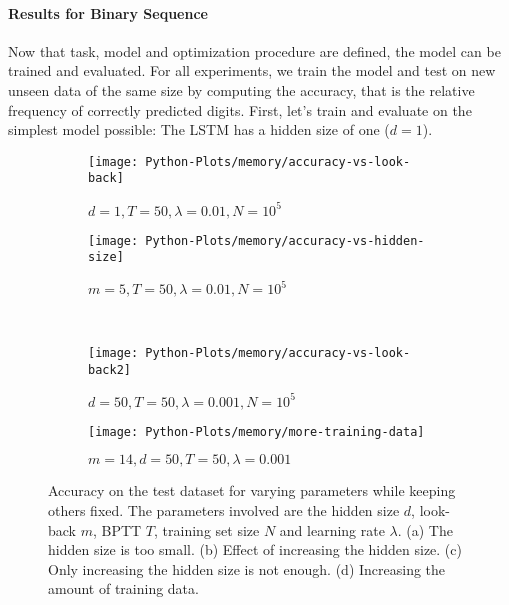 		\paragraph{Results for Binary Sequence}
		Now that task, model and optimization procedure are defined, the model can be trained and evaluated.
		For all experiments, we train the model and test on new unseen data of the same size by computing the accuracy, that is the relative frequency of correctly predicted digits.
		First, let's train and evaluate on the simplest model possible: The LSTM has a hidden size of one ($d = 1$).
		\begin{figure}[tb]
			\centering
			\begin{subfigure}[b]{0.5\linewidth}
				\centering
				\texttt{[image: Python-Plots/memory/accuracy-vs-look-back]}
				\caption{
					$d = 1, T = 50, \lambda = 0.01, N = 10^5$
					\label{fig:accuracy-vs-look-back}
				}
			\end{subfigure}%
			\begin{subfigure}[b]{0.5\linewidth}
				\texttt{[image: Python-Plots/memory/accuracy-vs-hidden-size]}
				\caption{
					$m = 5, T = 50, \lambda = 0.01, N = 10^5$
					\label{fig:accuracy-vs-hidden-size}
				}
			\end{subfigure}
			\\
			\begin{subfigure}[b]{0.5\linewidth}
				\texttt{[image: Python-Plots/memory/accuracy-vs-look-back2]}
				\caption{
					$d = 50, T = 50, \lambda = 0.001, N = 10^5$
					\label{fig:accuracy-vs-look-back2}
				}
			\end{subfigure}%
			\begin{subfigure}[b]{0.5\linewidth}
				\texttt{[image: Python-Plots/memory/more-training-data]}
				\caption{
					$m = 14, d = 50, T = 50, \lambda = 0.001$
					\label{fig:more-training-data}
				}
			\end{subfigure}
			\caption[Memorizing the past with the LSTM: Binary digits]
			{Accuracy on the test dataset for varying parameters while keeping others fixed. 
				The parameters involved are the hidden size $d$, look-back $m$, BPTT $T$, training set size $N$ and learning rate $\lambda$. 
				(a) The hidden size is too small.
				(b) Effect of increasing the hidden size.
				(c) Only increasing the hidden size is not enough.
				(d) Increasing the amount of training data.}
			\label{fig:ablation-study-binary-memory}
		\end{figure}
